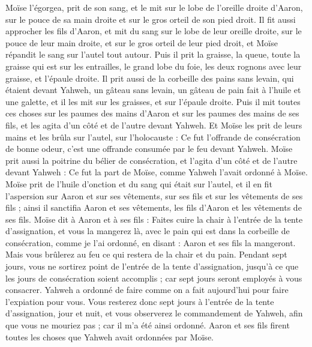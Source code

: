 \begin{multicols}{2}
Moïse l’égorgea, prit de son sang, et le mit sur le lobe de l'oreille droite d'Aaron, sur le pouce de sa main droite et sur le gros orteil de son pied droit.
Il fit aussi approcher les fils d'Aaron, et mit du sang sur le lobe de leur oreille droite, sur le pouce de leur main droite, et sur le gros orteil de leur pied droit, et Moïse répandit le sang sur l'autel tout autour.
Puis il prit la graisse, la queue, toute la graisse qui est sur les entrailles, le grand lobe du foie, les deux rognons avec leur graisse, et l'épaule droite.
Il prit aussi de la corbeille des pains sans levain, qui étaient devant Yahweh, un gâteau sans levain, un gâteau de pain fait à l'huile et une galette, et il les mit sur les graisses, et sur l'épaule droite.
Puis il mit toutes ces choses sur les paumes des mains d'Aaron et sur les paumes des mains de ses fils, et les agita d’un côté et de l’autre devant Yahweh.
Et Moïse les prit de leurs mains et les brûla sur l'autel, sur l'holocauste : Ce fut l’offrande de consécration de bonne odeur, c'est une offrande consumée par le feu devant Yahweh.
Moïse prit aussi la poitrine du bélier de consécration, et l’agita d’un côté et de l’autre devant Yahweh : Ce fut la part de Moïse, comme Yahweh l'avait ordonné à Moïse.
Moïse prit de l'huile d’onction et du sang qui était sur l'autel, et il en fit l’aspersion sur Aaron et sur ses vêtements, sur ses fils et sur les vêtements de ses fils ; ainsi il sanctifia Aaron et ses vêtements, les fils d’Aaron et les vêtements de ses fils.
Moïse dit à Aaron et à ses fils : Faites cuire la chair à l'entrée de la tente d'assignation, et vous la mangerez là, avec le pain qui est dans la corbeille de consécration, comme je l’ai ordonné, en disant : Aaron et ses fils la mangeront.
Mais vous brûlerez au feu ce qui restera de la chair et du pain.
Pendant sept jours, vous ne sortirez point de l'entrée de la tente d'assignation, jusqu’à ce que les jours de consécration soient accomplis ; car sept jours seront employés à vous consacrer.
Yahweh a ordonné de faire comme on a fait aujourd’hui pour faire l’expiation pour vous.
Vous resterez donc sept jours à l'entrée de la tente d'assignation, jour et nuit, et vous observerez le commandement de Yahweh, afin que vous ne mouriez pas ; car il m'a été ainsi ordonné.
Aaron et ses fils firent toutes les choses que Yahweh avait ordonnées par Moïse.

\end{multicols}
